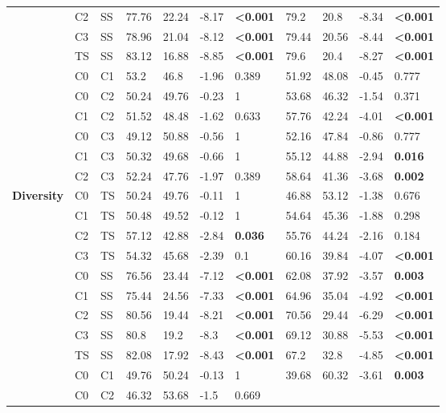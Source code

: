\documentclass{article}
\begin{document}
\begin{table}[htp]
\begin{tabular}{l l l l l l l l l l l}
 & C2 & SS & 77.76 & 22.24 & -8.17 & \textbf{\textless0.001}
& 79.2 & 20.8 & -8.34 & \textbf{\textless0.001}
\\
 & C3 & SS & 78.96 & 21.04 & -8.12 & \textbf{\textless0.001}
& 79.44 & 20.56 & -8.44 & \textbf{\textless0.001}
\\
 & TS & SS & 83.12 & 16.88 & -8.85 & \textbf{\textless0.001}
& 79.6 & 20.4 & -8.27 & \textbf{\textless0.001}
\\
 & C0 & C1 & 53.2 & 46.8 & -1.96 & 0.389
& 51.92 & 48.08 & -0.45 & 0.777
\\
 & C0 & C2 & 50.24 & 49.76 & -0.23 & 1
& 53.68 & 46.32 & -1.54 & 0.371
\\
 & C1 & C2 & 51.52 & 48.48 & -1.62 & 0.633
& 57.76 & 42.24 & -4.01 & \textbf{\textless0.001}
\\
 & C0 & C3 & 49.12 & 50.88 & -0.56 & 1
& 52.16 & 47.84 & -0.86 & 0.777
\\
 & C1 & C3 & 50.32 & 49.68 & -0.66 & 1
& 55.12 & 44.88 & -2.94 &\textbf{0.016}
\\
 & C2 & C3 & 52.24 & 47.76 & -1.97 & 0.389
& 58.64 & 41.36 & -3.68 & \textbf{0.002}
\\
 \hline
\multirow{15}{*}{\textbf{Diversity}} & C0 & TS & 50.24 & 49.76 & -0.11 & 1
& 46.88 & 53.12 & -1.38 & 0.676
\\
 & C1 & TS & 50.48 & 49.52 & -0.12 & 1
& 54.64 & 45.36 & -1.88 & 0.298
\\
 & C2 & TS & 57.12 & 42.88 & -2.84 & \textbf{0.036}
& 55.76 & 44.24 & -2.16 & 0.184
\\
 & C3 & TS & 54.32 & 45.68 & -2.39 & 0.1
& 60.16 & 39.84 & -4.07 & \textbf{\textless0.001}
\\
 & C0 & SS & 76.56 & 23.44 & -7.12 & \textbf{\textless0.001}
& 62.08 & 37.92 & -3.57 & \textbf{0.003}
\\
 & C1 & SS & 75.44 & 24.56 & -7.33 & \textbf{\textless0.001}
& 64.96 & 35.04 & -4.92 & \textbf{\textless0.001}
\\
 & C2 & SS & 80.56 & 19.44 & -8.21 & \textbf{\textless0.001}
& 70.56 & 29.44 & -6.29 & \textbf{\textless0.001}
\\
 & C3 & SS & 80.8 & 19.2 & -8.3 & \textbf{\textless0.001}
& 69.12 & 30.88 & -5.53 & \textbf{\textless0.001}
\\
 & TS & SS & 82.08 & 17.92 & -8.43 & \textbf{\textless0.001}
& 67.2 & 32.8 & -4.85 & \textbf{\textless0.001}
\\
 & C0 & C1 & 49.76 & 50.24 & -0.13 & 1
& 39.68 & 60.32 & -3.61 &\textbf{0.003}
\\
 & C0 & C2 & 46.32 & 53.68 & -1.5 & 0.669

\end{tabular}
\end{table}
\end{document}
